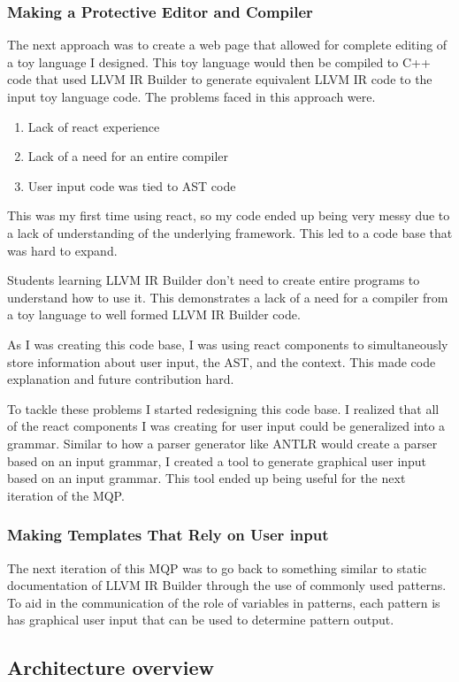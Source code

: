 \documentclass[hidelinks,12pt]{article}
\begin{document}
\begin{doublespacing}
\subsubsection*{Making a Protective Editor and Compiler}
The next approach was to create a web page that allowed for complete editing of a toy language I designed. This toy language would then be compiled to C++ code that used LLVM IR Builder to generate equivalent LLVM IR code to the input toy language code. The problems faced in this approach were.
\begin{enumerate}
    \item Lack of react experience
    \item Lack of a need for an entire compiler
    \item User input code was tied to AST code
\end{enumerate}
This was my first time using react, so my code ended up being very messy due to a lack of understanding of the underlying framework. This led to a code base that was hard to expand.

Students learning LLVM IR Builder don't need to create entire programs to understand how to use it. This demonstrates a lack of a need for a compiler from a toy language to well formed LLVM IR Builder code. 

As I was creating this code base, I was using react components to simultaneously store information about user input, the AST, and the context. This made code explanation and future contribution hard.

To tackle these problems I started redesigning this code base. I realized that all of the react components I was creating for user input could be generalized into a grammar. Similar to how a parser generator like ANTLR would create a parser based on an input grammar, I created a tool to generate graphical user input based on an input grammar. This tool ended up being useful for the next iteration of the MQP.
\subsubsection*{Making Templates That Rely on User input}
The next iteration of this MQP was to go back to something similar to static documentation of LLVM IR Builder through the use of commonly used patterns. To aid in the communication of the role of variables in patterns, each pattern is has graphical user input that can be used to determine pattern output.
\subsection{Architecture overview}

\end{doublespacing}
\end{document}
